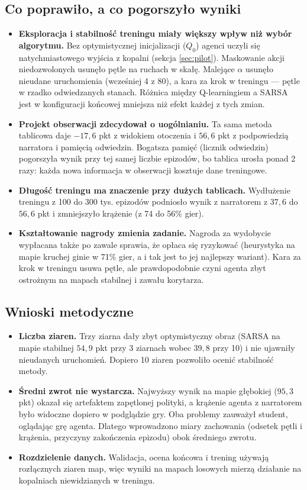 \documentclass[11pt,a4paper]{article}
\begin{document}
\subsection{Co poprawiło, a co pogorszyło wyniki}
\begin{itemize}
  \item \textbf{Eksploracja i stabilność treningu miały większy wpływ niż wybór
  algorytmu.} Bez optymistycznej inicjalizacji ($Q_0$) agenci uczyli się
  natychmiastowego wyjścia z kopalni (sekcja \ref{sec:pilot}). Maskowanie akcji
  niedozwolonych usunęło pętle na ruchach w skałę. Malejące $\alpha$ usunęło nieudane
  uruchomienia (wcześniej 4 z 80), a kara za krok w treningu --- pętle w rzadko
  odwiedzanych stanach. Różnica między Q-learningiem a SARSA jest w konfiguracji
  końcowej mniejsza niż efekt każdej z tych zmian.
  \item \textbf{Projekt obserwacji zdecydował o uogólnianiu.} Ta sama metoda
  tablicowa daje $-17{,}6$ pkt z widokiem otoczenia i $56{,}6$ pkt z podpowiedzią
  narratora i pamięcią odwiedzin. Bogatsza pamięć (licznik odwiedzin) pogorszyła
  wynik przy tej samej liczbie epizodów, bo tablica urosła ponad 2 razy: każda nowa
  informacja w obserwacji kosztuje dane treningowe.
  \item \textbf{Długość treningu ma znaczenie przy dużych tablicach.} Wydłużenie
  treningu z 100 do 300 tys. epizodów podniosło wynik z narratorem z $37{,}6$ do
  $56{,}6$ pkt i zmniejszyło krążenie (z 74 do 56\% gier).
  \item \textbf{Kształtowanie nagrody zmienia zadanie.} Nagroda za wydobycie
  wypłacana także po zawale sprawia, że opłaca się ryzykować (heurystyka na mapie
  kruchej ginie w 71\% gier, a i tak jest to jej najlepszy wariant). Kara za krok
  w treningu usuwa pętle, ale prawdopodobnie czyni agenta zbyt ostrożnym na mapach
  stabilnej i zawału korytarza.
\end{itemize}

\subsection{Wnioski metodyczne}
\begin{itemize}
  \item \textbf{Liczba ziaren.} Trzy ziarna dały zbyt optymistyczny obraz (SARSA na
  mapie stabilnej $54{,}9$ pkt przy 3 ziarnach wobec $39{,}8$ przy 10) i nie ujawniły
  nieudanych uruchomień. Dopiero 10 ziaren pozwoliło ocenić stabilność metody.
  \item \textbf{Średni zwrot nie wystarcza.} Najwyższy wynik na mapie głębokiej
  ($95{,}3$ pkt) okazał się artefaktem zapętlonej polityki, a krążenie agenta
  z narratorem było widoczne dopiero w podglądzie gry. Oba problemy zauważył student,
  oglądając grę agenta. Dlatego wprowadzono miary zachowania (odsetek pętli i krążenia,
  przyczyny zakończenia epizodu) obok średniego zwrotu.
  \item \textbf{Rozdzielenie danych.} Walidacja, ocena końcowa i trening używają
  rozłącznych ziaren map, więc wyniki na mapach losowych mierzą działanie na
  kopalniach niewidzianych w treningu.
\end{itemize}
\end{document}
